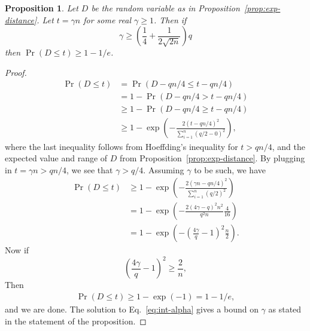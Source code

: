 \documentclass[pdflatex,sn-mathphys-num]{sn-jnl}
\newtheorem{proposition}{Proposition}
\theoremstyle{definition}
\begin{document}
\begin{proposition}
\label{prop:within-t-prob}
Let $D$ be the random variable as in Proposition~\ref{prop:exp-distance}. Let $t = \gamma n$ for some real $\gamma \ge 1$. Then if
\[
\gamma \geq \left(\frac{1}{4} + \frac{1}{2\sqrt{2n}}\right) q
\]
then $\Pr(D \leq t) \geq 1 - 1/e$.
\end{proposition}
\begin{proof}
\begin{align*}
    \Pr(D \leq t) &= \Pr(D - qn/4 \leq t - qn/4)\\
                &= 1 - \Pr(D- qn/4 > t - qn/4)\\
                &\geq 1 - \Pr(D -qn/4 \geq t - qn/4)\\
                &\geq 1 - \exp\left( - \frac{2(t-qn/4)^2}{\sum_{i=1}^n (q/2 - 0)^2}\right),
\end{align*}
where the last inequality follows from Hoeffding's inequality for $t > qn/4$, and the expected value and range of $D$ from Proposition~\ref{prop:exp-distance}. By plugging in $t = \gamma n > qn /4$, we see that $\gamma > q/4$. Assuming $\gamma$ to be such, we have
\begin{align*}
    \Pr(D \leq t) &\geq 1 - \exp\left( - \frac{2(\gamma n -qn/4)^2}{\sum_{i=1}^n (q/2)^2}\right)\\
    &= 1 - \exp\left( - \frac{2(4\gamma -q)^2n^2}{q^2 n}\frac{4}{16}\right)\\
    &= 1 - \exp\left( - \left( \frac{4\gamma}{q} - 1\right)^2 \frac{n}{2}\right).
\end{align*}
Now if 
\begin{equation}
\label{eq:int-alpha}
     \left( \frac{4\gamma}{q} - 1\right)^2 \geq \frac{2}{n},
\end{equation}
Then 
\begin{align*}
    \Pr(D \leq t) \geq 1 - \exp(-1) = 1 - 1/e,
\end{align*}
and we are done. The solution to Eq.~\eqref{eq:int-alpha} gives a bound on $\gamma$ as stated in the statement of the proposition.
\end{proof}
\end{document}
